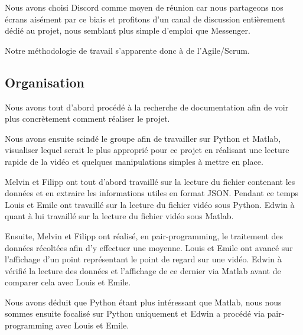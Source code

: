 \documentclass[12pt]{article}
\begin{document}
\hspace{0.3cm}

Nous avons choisi Discord comme moyen de réunion car nous partageons nos écrans aisément par ce biais et profitons d'un canal de discussion entièrement dédié au projet, nous semblant plus simple d'emploi que Messenger.

\hspace{0.3cm}

Notre méthodologie de travail s'apparente donc à de l'Agile/Scrum.

\subsection{Organisation}

Nous avons tout d'abord procédé à la recherche de documentation afin de voir plus concrètement comment réaliser le projet.

\hspace{0.3cm}

Nous avons ensuite scindé le groupe afin de travailler sur Python et Matlab, visualiser lequel serait le plus approprié pour ce projet en réalisant une lecture rapide de la vidéo et quelques manipulations simples à mettre en place.

\hspace{0.3cm}

Melvin et Filipp ont tout d'abord travaillé sur la lecture du fichier contenant les données et en extraire les informations utiles en format JSON.
Pendant ce temps Louis et Emile ont travaillé sur la lecture du fichier vidéo sous Python.
Edwin à quant à lui travaillé sur la lecture du fichier vidéo sous Matlab.

\hspace{0.3cm}

Ensuite, Melvin et Filipp ont réalisé, en pair-programming, le traitement des données récoltées afin d'y effectuer une moyenne.
Louis et Emile ont avancé sur l'affichage d'un point représentant le point de regard sur une vidéo.
Edwin à vérifié la lecture des données et l'affichage de ce dernier via Matlab avant de comparer cela avec Louis et Emile.

\hspace{0.3cm}

Nous avons déduit que Python étant plus intéressant que Matlab, nous nous sommes ensuite focalisé sur Python uniquement et Edwin a procédé via pair-programming avec Louis et Emile.

\hspace{0.3cm}
\end{document}
